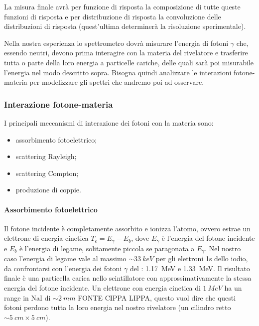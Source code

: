 La misura finale avrà per funzione di risposta la composizione di tutte queste funzioni di risposta e per distribuzione di risposta la convoluzione delle distribuzioni di risposta (quest'ultima determinerà la risoluzione sperimentale).

Nella nostra esperienza lo spettrometro dovrà misurare l'energia di fotoni $\gamma$ che, essendo neutri, devono prima interagire con la materia del rivelatore e trasferire tutta o parte della loro energia a particelle cariche, delle quali sarà poi misurabile l'energia nel modo descritto sopra. Bisogna quindi analizzare le interazioni fotone-materia per modelizzare gli spettri che andremo poi ad osservare.

\subsubsection{Interazione fotone-materia}
I principali meccanismi di interazione dei fotoni con la materia sono:
\begin{itemize}
	\item assorbimento fotoelettrico;
	\item scattering Rayleigh;
	\item scattering Compton;
	\item produzione di coppie.
\end{itemize}
  
 \paragraph{Assorbimento fotoelettrico}
 Il fotone incidente è completamente assorbito e ionizza l'atomo, ovvero estrae un elettrone di energia cinetica $T_e = E_{\gamma} - E_b$, dove $E_{\gamma}$ è l'energia del fotone incidente e $E_b$ è l'energia di legame, solitamente piccola se paragonata a $E_{\gamma}$. Nel nostro caso l'energia di legame vale al massimo $\sim \SI{33}{keV}$ per gli elettroni 1s dello iodio, da confrontarsi con l'energia dei fotoni $\gamma$ del \co\;: \SI{1.17}{MeV} e \SI{1.33}{MeV}. Il risultato finale è una particella carica nello scintillatore con approssimativamente la stessa energia del fotone incidente.
 Un elettrone con energia cinetica di $\SI{1}{MeV}$ ha un range in NaI di $\sim \SI{2}{mm}$ FONTE CIPPA LIPPA, questo vuol dire che questi fotoni perdono tutta la loro energia nel nostro rivelatore (un cilindro retto $\sim \SI{5}{cm} \times \SI{5}{cm}$). 

